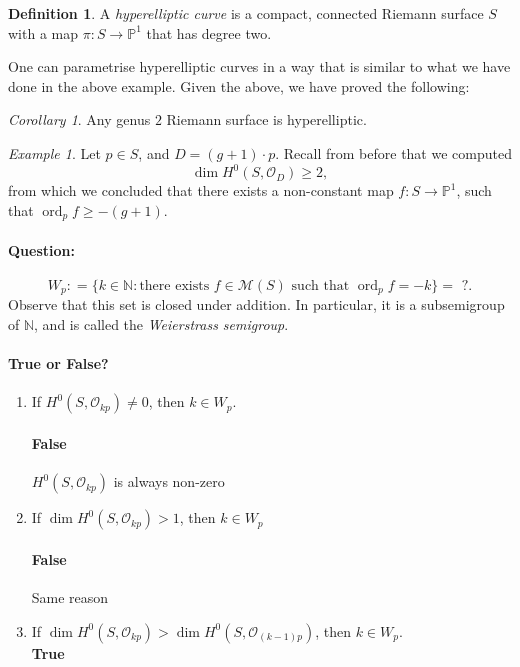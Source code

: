 \documentclass[a4paper]{report}
\theoremstyle{definition}
\newtheorem{definition}{Definition}
\theoremstyle{remark}
\theoremstyle{proposition}
\theoremstyle{conjecture}
\theoremstyle{lemma}
\theoremstyle{corollary}
\newtheorem{corollary}{Corollary}
\theoremstyle{exercise}
\theoremstyle{example}
\newtheorem{example}{Example}
\newcommand{\mcal}{\mathcal}
\newcommand{\on}{\operatorname}
\begin{document}
\begin{definition}
    A \emph{hyperelliptic curve} is a compact, connected Riemann surface 
    $S$ with a map $\pi : S \to \mathbb{P}^1$ that has degree two.
\end{definition}

One can parametrise hyperelliptic curves in a way that is similar to what 
we have done in the above example. 
Given the above, we have proved the following:

\begin{corollary}
    Any genus $2$ Riemann surface is hyperelliptic.
\end{corollary}

\begin{example}
    Let $p\in S$, and $D = (g+1)\cdot p$. Recall from before that 
    we computed 
    $$\dim H^0(S,\mcal{O}_D) \geq 2,$$
    from which we concluded that there exists a non-constant map 
    $f : S \to \mathbb{P}^1$, such that 
    $\on{ord}_pf \geq -(g+1)$.
    \paragraph{Question:} 
    $$W_p: = \lbrace k \in \mathbb{N} : \text{there exists $f\in \mcal{M}(S)$ such that $\on{ord}_pf = -k$}\rbrace = \,\,?.$$
    Observe that this set is closed under addition. In particular, it is a 
    subsemigroup of $\mathbb{N}$, and is called the \emph{Weierstrass 
    semigroup}.
    \paragraph{True or False?} 
    \begin{enumerate}
        \item If $H^0(S,\mcal{O}_{kp})\neq 0$, then $k\in W_p$. 
            \paragraph{False} $H^0(S,\mcal{O}_{kp})$ is always non-zero
        \item If $\dim H^0(S,\mcal{O}_{kp}) > 1$, then $k \in W_p$
            \paragraph{False} Same reason
        \item If $\dim H^0(S,\mcal{O}_{kp}) > \dim H^0(S,\mcal{O}_{(k-1)p})$,
            then $k\in W_p$.\\
            \textbf{True} 
    \end{enumerate}
\end{example}
\end{document}
